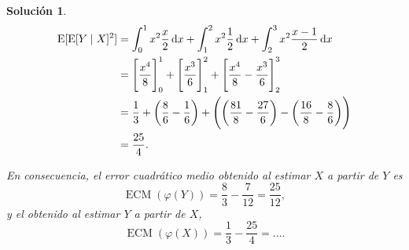 \documentclass[
  a4paper,
  spanish,
  12pt,
]{scrartcl}
\theoremstyle{ejercicio-style}
\theoremstyle{remark-style}
\newtheorem*{sol}{Solución}
\begin{document}
\begin{sol}
  \begin{align*}
    \operatorname{E}[\operatorname{E}[Y \mid X]^2]
    &= \int_0^1 x^2\frac{x}{2} \dif x 
     + \int_1^2 x^2\frac{1}{2} \dif x
     + \int_2^3 x^2\frac{x-1}{2} \dif x\\
    &= \left[\frac{x^4}{8}\right]_0^1 
     + \left[\frac{x^3}{6}\right]_1^2 
     + \left[\frac{x^4}{8} - \frac{x^3}{6}\right]_2^3\\ 
    &= \frac{1}{3} 
     + \left(\frac{8}{6} - \frac{1}{6}\right) 
     + \left(\left(\frac{81}{8} - \frac{27}{6}\right) - \left(\frac{16}{8} - \frac{8}{6}\right)\right)\\ 
    &= \frac{25}{4}.
  \end{align*}

  En consecuencia, el error cuadrático medio obtenido al estimar \(X\) a partir de \(Y\) es 
  \[
    \operatorname{ECM}(\varphi(Y)) = \frac{8}{3} - \frac{7}{12} = \frac{25}{12},
  \]
  y el obtenido al estimar \(Y\) a partir de \(X\),
  \[
    \operatorname{ECM}(\varphi(X)) = \frac{1}{3} - \frac{25}{4} = ....
  \]
\end{sol}
\end{document}
